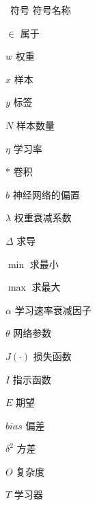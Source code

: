 \begin{symbollist}
	
	\item ~符号 \hspace{12em} 符号名称
	\item $\in$\hspace{12.5em} 属于
	\item $w$ \hspace{12.5em} 权重
	\item $x$ \hspace{12.5em} 样本
	\item $y$ \hspace{12.5em} 标签
	\item $N$ \hspace{12.5em} 样本数量
	\item $\eta$ \hspace{12.5em} 学习率
	\item $*$ \hspace{12.5em} 卷积
	\item $b$ \hspace{12.5em} 神经网络的偏置
	\item $\lambda$ \hspace{12.5em} 权重衰减系数
	\item $\Delta$ \hspace{12.5em} 求导
	\item $\min$ \hspace{12.5em} 求最小
	\item $\max$ \hspace{12.5em} 求最大
	\item $\alpha$ \hspace{12.5em} 学习速率衰减因子
	\item $\theta$ \hspace{12.5em} 网络参数
	\item $J(\cdot)$ \hspace{12.5em} 损失函数
	\item $I$ \hspace{12.5em} 指示函数
	\item $E$ \hspace{12.5em} 期望
	\item $bias$ \hspace{12.5em} 偏差
	\item $\delta^2$ \hspace{12.5em} 方差
	\item $O$ \hspace{12.5em} 复杂度
	\item $T$ \hspace{12.5em} 学习器

\end{symbollist}

